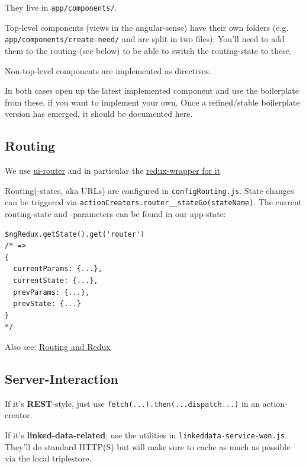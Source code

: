 They live in \texttt{app/components/}. %

Top-level components (views in the angular-sense) have their own folders
(e.g. \texttt{app/components/create-need/} and are split in two files).
You'll need to add them to the routing (see below) to be able to switch
the routing-state to these.

Non-top-level components are implemented as directives.

In both cases open up the latest implemented component and use the
boilerplate from these, if you want to implement your own. Once a
refined/stable boilerplate version has emerged, it should be documented
here.

\subsection{Routing}\label{routing}

We use
\href{https://github.com/angular-ui/ui-router/wiki/Quick-Reference}{ui-router}
and in particular the
\href{https://github.com/neilff/redux-ui-router}{redux-wrapper for it}

Routing(-states, aka URLs) are configured in \texttt{configRouting.js}. %
State changes can be triggered via
\texttt{actionCreators.router\_\_stateGo(stateName)}. %
The current
routing-state and -parameters can be found in our app-state:

\begin{verbatim}
$ngRedux.getState().get('router')
/* =>
{
  currentParams: {...},
  currentState: {...},
  prevParams: {...},
  prevState: {...}
}
*/
\end{verbatim}

Also see:
\href{https://github.com/researchstudio-sat/webofneeds/issues/344}{Routing
and Redux} %

\subsection{Server-Interaction}\label{server-interaction}

If it's \textbf{REST}-style, just use
\texttt{fetch(...).then(...dispatch...)} in an action-creator.

If it's \textbf{linked-data-related}, use the utilities in
\texttt{linkeddata-service-won.js}. They'll do standard HTTP(S) but will
make sure to cache as much as possible via the local triplestore.

